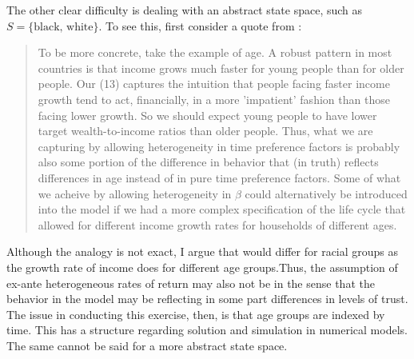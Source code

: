 \documentclass[\econtexRoot/Preproposal]{subfiles}
\begin{document}
\par The other clear difficulty is dealing with an abstract state space, such as $S=\{\text{black, white}\}$. To see this, first consider a quote from \cite{cstw2017}:

\begin{quote}
  To be more concrete, take the example of age. A robust pattern in most countries is that income grows much faster for young people than for older people. Our  (13) captures the intuition that people facing faster income growth tend to act, financially, in a more 'impatient' fashion than those facing lower growth. So we should expect young people to have lower target wealth-to-income ratios than older people. Thus, what we are capturing by allowing heterogeneity in time preference factors is probably also some portion of the difference in behavior that (in truth) reflects differences in age instead of in pure time preference factors. Some of what we acheive by allowing heterogeneity in $\beta$ could alternatively be introduced into the model if we had a more complex specification of the life cycle that allowed for different income growth rates for households of different ages.
\end{quote}

\par Although the analogy is not exact, I argue that  would differ for racial groups as the growth rate of income does for different age groups.Thus, the assumption of ex-ante heterogeneous rates of return may also not be  in the sense that the behavior in the model may be reflecting in some part differences in levels of trust. The issue in conducting this exercise, then, is that age groups are indexed by time. This has a  structure regarding solution and simulation in numerical models. The same cannot be said for a more abstract state space.


\onlyinsubfile{}

\end{document}
